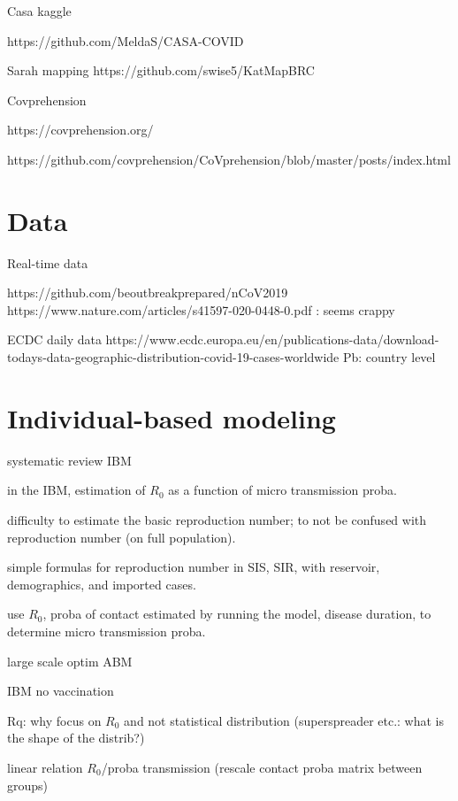 \documentclass[10pt]{article}
\begin{document}
Casa kaggle

https://github.com/MeldaS/CASA-COVID

Sarah mapping https://github.com/swise5/KatMapBRC

Covprehension

https://covprehension.org/

https://github.com/covprehension/CoVprehension/blob/master/posts/index.html


\section{Data}

Real-time data

https://github.com/beoutbreakprepared/nCoV2019
https://www.nature.com/articles/s41597-020-0448-0.pdf
: seems crappy

ECDC daily data https://www.ecdc.europa.eu/en/publications-data/download-todays-data-geographic-distribution-covid-19-cases-worldwide
Pb: country level

	
	
\section{Individual-based modeling}

\cite{willem2017lessons} systematic review IBM

\cite{kuylen2017social} in the IBM, estimation of $R_0$ as a function of micro transmission proba.

\cite{delamater2019complexity} difficulty to estimate the basic reproduction number; to not be confused with reproduction number (on full population).

\cite{mclure2020some} simple formulas for reproduction number in SIS, SIR, with reservoir, demographics, and imported cases.

\cite{hunter2018open} use $R_0$, proba of contact estimated by running the model, disease duration, to determine micro transmission proba.

\cite{willem2015optimizing} large scale optim ABM  

\cite{kisjes2014individual} IBM no vaccination
	
Rq: why focus on $R_0$ and not statistical distribution (superspreader etc.: what is the shape of the distrib?)

\cite{chao2010flute} linear relation $R_0$/proba transmission (rescale contact proba matrix between groups)
	
\end{document}
